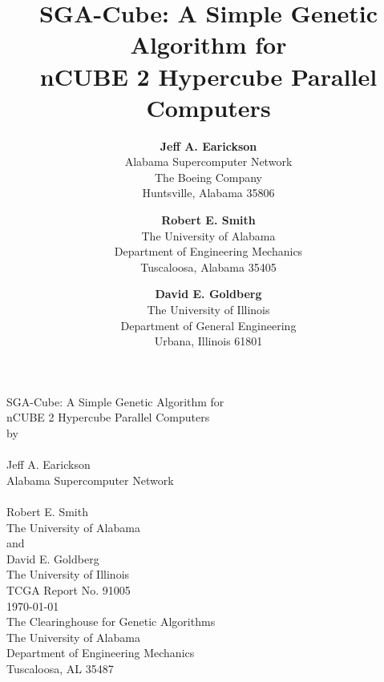 \pagestyle{empty}

\oddsidemargin=-0.375in
\evensidemargin=-0.375in
\topmargin=-0.375in
\textheight=9.25in
\textwidth=7in
\footheight=0in
\columnsep=0.25in
\headsep=0in
\headheight=0in

\def\btt#1{\bf{\tt #1}}




\begin{titlepage}
\begin{center}
\vspace*{2.35in}
SGA-Cube: A Simple Genetic Algorithm for  \\
nCUBE 2 Hypercube Parallel Computers
\ \\
by\\
\ \\
Jeff A. Earickson\\
Alabama Supercomputer Network\\
\ \\
Robert E. Smith\\
The University of Alabama\\
and\\
David E. Goldberg\\
The University of Illinois\\
\vspace{0.7in}
TCGA Report No. 91005\\
\today \\
\vspace{2.2in}
The Clearinghouse for Genetic Algorithms\\
The University of Alabama\\
Department of Engineering Mechanics\\
Tuscaloosa, AL 35487
\end{center}
\end{titlepage}

\title{SGA-Cube: A Simple Genetic Algorithm for  \\
nCUBE 2 Hypercube Parallel Computers}
\author{ {\bf Jeff A. Earickson}\\
Alabama Supercomputer Network\\
The Boeing Company\\
Huntsville, Alabama 35806
\and {\bf Robert E. Smith}\\
The University of Alabama\\
Department of Engineering Mechanics\\
Tuscaloosa, Alabama 35405 
\and {\bf David E. Goldberg}\\
The University of Illinois\\
Department of General Engineering\\
Urbana, Illinois 61801
}

